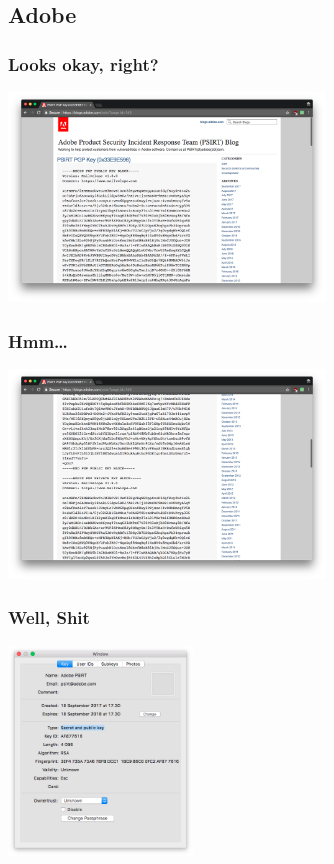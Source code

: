\documentclass[aspectratio=1610,bigger,utf8]{beamer}
\begin{document}
\subsection{Adobe}
\begin{frame}
	\frametitle{Looks okay, right?}
	\begin{center}
		\includegraphics[height=210px]{adobe-1}
	\end{center}
\end{frame}
\begin{frame}
	\frametitle{Hmm\ldots}
	\begin{center}
		\includegraphics[height=210px]{adobe-2}
	\end{center}
\end{frame}
\begin{frame}
	\frametitle{Well, Shit}
	\begin{center}
		\includegraphics[height=210px]{adobe-3}
	\end{center}
\end{frame}
\end{document}
